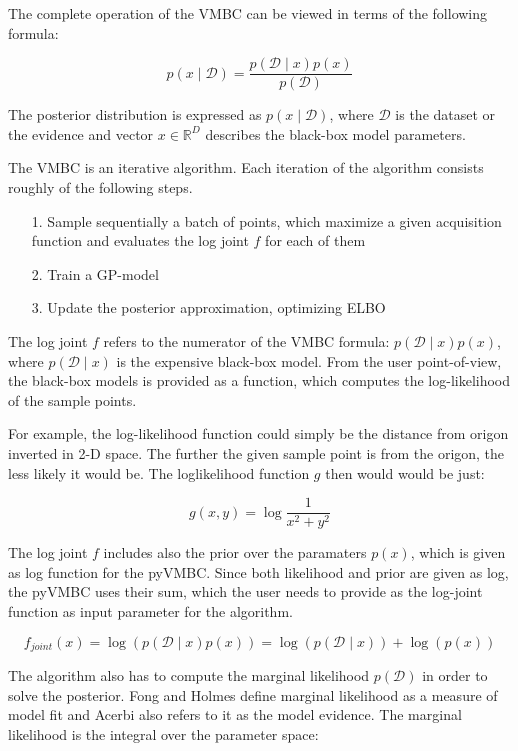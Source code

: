 \documentclass[english,oneside,openany]{UH_DS_report}
\begin{document}
The complete operation of the VMBC can be viewed in terms of the following formula:

$$p(x\mid\mathcal{D}) = \frac{p(\mathcal{D}\mid x)p(x)}{p(\mathcal{D})}$$

The posterior distribution is expressed as $p(x \mid \mathcal{D})$, where $\mathcal{D}$ 
is the dataset or the evidence and vector $x \in \mathbb{R}^D$ describes the black-box model parameters.

The VMBC is an iterative algorithm. Each iteration of the algorithm consists roughly of the following steps.

\begin{enumerate}

\item[1.] 
Sample sequentially a batch of points, which maximize a given acquisition function and evaluates the log joint $f$ for each of them
\item[2.] Train a GP-model
\item[3.] Update the posterior approximation, optimizing ELBO
\end{enumerate}

The log joint $f$ refers to the numerator of the VMBC formula: $p(\mathcal{D}\mid x)p(x)$, where $p(\mathcal{D}\mid x)$
is the expensive black-box model. From the user point-of-view, the black-box models is provided as a function, which 
computes the log-likelihood of the sample points.

For example, the log-likelihood function could simply be the distance from origon inverted in 2-D space.
The further the given sample point is from the origon, the less likely it would be. The loglikelihood function $g$ then would would be just:

$$
g(x,y) = \log \frac{1}{x^2 + y^2}
$$

The log joint $f$ includes also the prior over the paramaters $p(x)$, which is given as log function for the pyVMBC. 
Since both likelihood and prior are given as log, the pyVMBC uses their sum, which the user needs to provide as the log-joint
function as input parameter for the algorithm. 

$$f_{joint}(x) = \log(p(\mathcal{D}\mid x)p(x)) = \log (p(\mathcal{D}\mid x)) + \log(p(x))$$

The algorithm also has to compute the marginal likelihood $p(\mathcal{D})$ in order to solve the posterior.
Fong and Holmes define marginal likelihood as a measure of 
model fit\cite{holmes} and Acerbi also refers to it as the model evidence\cite{acerbi2018}. 
The marginal likelihood is the integral over the
parameter space:
\end{document}
